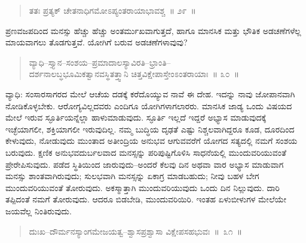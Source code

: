 
\begin{verse}
ತತಃ ಪ್ರತ್ಯಕ್​ ಚೇತನಾಧಿಗಮೋಽಪ್ಯಂತರಾಯಾಭಾವಶ್ಚ~॥ ೨೯~॥
\end{verse}

\vspace{-0.3cm}


\vskip 0.2cm

ಪ್ರಣವಜಪದಿಂದ ಮನಸ್ಸು ಹೆಚ್ಚು ಹೆಚ್ಚು ಅಂತರ್ಮುಖವಾಗುತ್ತದೆ, ಹಾಗೂ ಮಾನಸಿಕ ಮತ್ತು ಭೌತಿಕ ಅಡಚಣೆಗಳೆಲ್ಲ ಮಾಯವಾಗಲು ತೊಡಗುತ್ತವೆ. ಯೋಗಿಗೆ ಬರುವ ಅಡಚಣೆಗಳಾವುವು?

\vspace{-0.3cm}

\begin{verse}
ವ್ಯಾಧಿ–ಸ್ತ್ಯಾನ–ಸಂಶಯ–ಪ್ರಮಾದಾಲಸ್ಯಾವಿರತಿ–ಭ್ರಾಂತಿ–\\ದರ್ಶನಾಲಬ್ಧಭೂಮಿಕತ್ವಾನವಸ್ಥಿತತ್ತ್ವಾನಿ ಚಿತ್ತವಿಕ್ಷೇಪಾಸ್ತೇಂಽಂತರಾಯಾಃ~॥ ೩೦~॥
\end{verse}

\vspace{-0.32cm}


\vspace{0.2cm}

ವ್ಯಾಧಿ: ಸಂಸಾರಸಾಗರದ ಮೇಲೆ ಆಚೆಯ ದಡಕ್ಕೆ ಕರೆದೊಯ್ಯುವ ನಾವೆ ಈ ದೇಹ. ಇದನ್ನು ನಾವು ಜೋಪಾನವಾಗಿ ನೋಡಿಕೊಳ್ಳಬೇಕು. ಆರೋಗ್ಯವಿಲ್ಲದವರು ಎಂದಿಗೂ ಯೋಗಿಗಳಾಗಲಾರರು. ಮಾನಸಿಕ ಜಾಡ್ಯ ಒಂದು ವಿಷಯದ ಮೇಲೆ ಇರುವ ಸ್ಫೂರ್ತಿಯನ್ನೆಲ್ಲಾ ಹಾಳುಮಾಡುವುದು. ಸ್ಫೂರ್ತಿ ಇಲ್ಲದೆ ಇದ್ದರೆ ಅಭ್ಯಾಸ ಮಾಡುವುದಕ್ಕೆ ಇಚ್ಛೆಯಾಗಲೀ, ಶಕ್ತಿಯಾಗಲೀ ಇರುವುದಿಲ್ಲ. ನಮ್ಮ ಬುದ್ಧಿಯ ದೃಢತೆ ಎಷ್ಟು ನಿಶ್ಚಲವಾಗಿದ್ದರೂ ಕೂಡ, ದೂರದಿಂದ ಕೇಳುವುದು, ನೋಡುವುದು ಮುಂತಾದ ಅತೀಂದ್ರಿಯ ಅನುಭವ ಆಗುವವರೆಗೆ ಯೋಗದ ಸತ್ಯದಲ್ಲಿ ನಮಗೆ ಸಂಶಯ ಬರುವುದು. ಕ್ಷಣಿಕ ಅನುಭವ\break ದುರ್ಬಲವಾದ ಮನಸ್ಸನ್ನು ಪರಿಪುಷ್ಟಿಗೊಳಿಸಿ ಸಾಧನೆಯಲ್ಲಿ ಮುಂದುವರಿಯುವಂತೆ ಪ್ರೇರೇಪಿಸುವುದು. ಪಡೆದ ಸ್ಥಿತಿಯಿಂದ ಜಾರುವುದು–ಅಂದರೆ ಕೆಲವು ದಿನ ಅಥವಾ ವಾರ ಅಭ್ಯಾಸ ಮಾಡುವಾಗ ಮನಸ್ಸು ಶಾಂತವಾಗಿರುವುದು; ಸುಲಭವಾಗಿ ಮನಸ್ಸನ್ನು ಏಕಾಗ್ರ ಮಾಡಬಹುದು; ನೀವು ಬಹಳ ಬೇಗ ಮುಂದುವರಿಯುವಂತೆ ತೋರುವುದು. ಅಕಸ್ಮಾತ್ತಾಗಿ ಮುಂದುವರಿಯುವುದು ಒಂದು ದಿನ ನಿಲ್ಲುವುದು. ದಾರಿ ತಪ್ಪಿದಂತೆ ನಮಗೆ ತೋರುವುದು. ಆದರೂ ಬಿಡಬೇಡಿ, ಮುಂದುವರಿಯಿರಿ. ಇಂತಹ ಏಳುಬೀಳುಗಳ ಮೇಲೆಯೇ ಜಯವೆಲ್ಲ ನಿಂತಿರುವುದು. 

\vspace{-0.3cm}

\begin{verse}
ದುಃಖ–ದೌರ್ಮನಸ್ಯಾಂಗಮೇಜಯತ್ವ–ಶ್ವಾಸಪ್ರಶ್ವಾಸಾ ವಿಕ್ಷೇಪಸಹಭುವಃ~॥~೩೧~॥
\end{verse}


